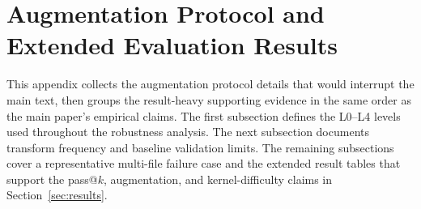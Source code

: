 




\section{Augmentation Protocol and Extended Evaluation Results}
\label{sec:appendix-e}

This appendix collects the augmentation protocol details that would interrupt the
main text, then groups the result-heavy supporting evidence in the same order as
the main paper's empirical claims. The first subsection defines the L0--L4
levels used throughout the robustness analysis. The next subsection documents
transform frequency and baseline validation limits. The remaining subsections
cover a representative multi-file failure case and the extended result tables
that support the pass@$k$, augmentation, and kernel-difficulty claims in
Section~\ref{sec:results}.

